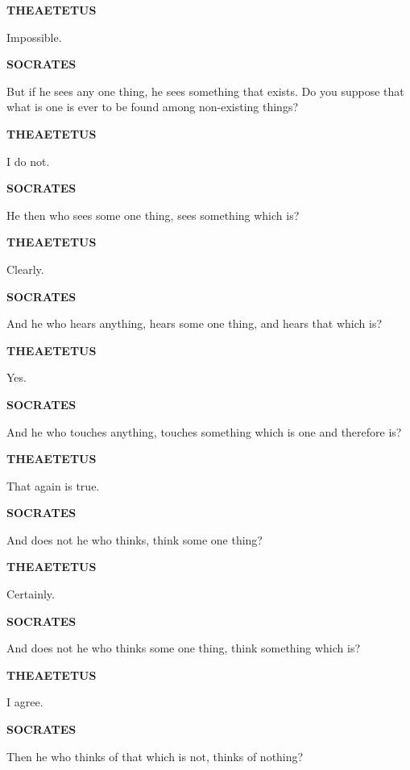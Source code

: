 \documentclass[11pt,letter]{article}
\begin{document}
\par \textbf{THEAETETUS}
\par   Impossible.

\par \textbf{SOCRATES}
\par   But if he sees any one thing, he sees something that exists. Do you suppose that what is one is ever to be found among non-existing things?

\par \textbf{THEAETETUS}
\par   I do not.

\par \textbf{SOCRATES}
\par   He then who sees some one thing, sees something which is?

\par \textbf{THEAETETUS}
\par   Clearly.

\par \textbf{SOCRATES}
\par   And he who hears anything, hears some one thing, and hears that which is?

\par \textbf{THEAETETUS}
\par   Yes.

\par \textbf{SOCRATES}
\par   And he who touches anything, touches something which is one and therefore is?

\par \textbf{THEAETETUS}
\par   That again is true.

\par \textbf{SOCRATES}
\par   And does not he who thinks, think some one thing?

\par \textbf{THEAETETUS}
\par   Certainly.

\par \textbf{SOCRATES}
\par   And does not he who thinks some one thing, think something which is?

\par \textbf{THEAETETUS}
\par   I agree.

\par \textbf{SOCRATES}
\par   Then he who thinks of that which is not, thinks of nothing?
\end{document}
